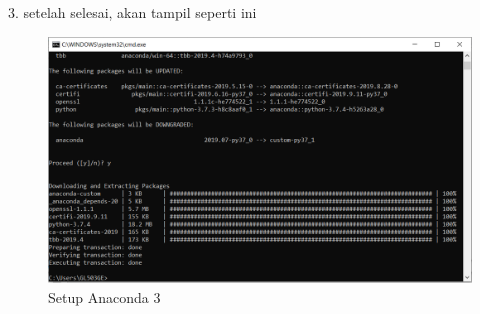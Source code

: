 \documentclass{article}
\begin{document}
\\
\\
\\
\\
\\
\\
\\
\\
\\
\\
\\
\\
\\
\\
\\
\\
\\
\\
\\
\\
\\
\\
\\
\\
\\
\\
3. setelah selesai, akan tampil seperti ini
\begin{figure}[h]
	\centering
		\includegraphics[scale=0.5]{Gambar/D3.PNG}
		\caption{Setup Anaconda 3}
\end{figure}
\\
\\
\\
\\
\\
\\
\\
\\
\\
\\
\\
\\
\\
\\
\\
\\
\\
\\
\\
\\
\\
\\
\\
\\
\\
\\
\end{document}
